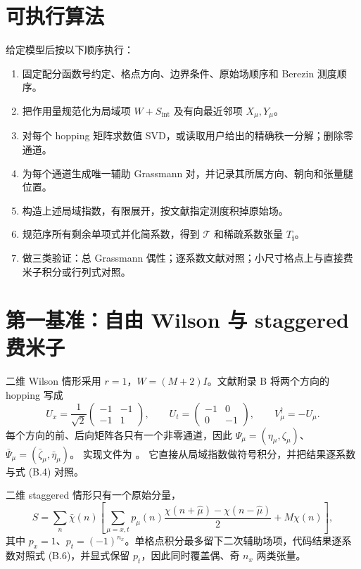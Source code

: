 \documentclass[UTF8,11pt]{ctexart}
\newcommand{\cT}{\mathcal{T}}
\begin{document}
\section{可执行算法}
给定模型后按以下顺序执行：
\begin{enumerate}
 \item 固定配分函数号约定、格点方向、边界条件、原始场顺序和 Berezin 测度顺序。
 \item 把作用量规范化为局域项 $W+S_{\mathrm{int}}$ 及有向最近邻项 $X_\mu,Y_\mu$。
 \item 对每个 hopping 矩阵求数值 SVD，或读取用户给出的精确秩一分解；删除零通道。
 \item 为每个通道生成唯一辅助 Grassmann 对，并记录其所属方向、朝向和张量腿位置。
 \item 构造上述局域指数，有限展开，按文献指定测度积掉原始场。
 \item 规范序所有剩余单项式并化简系数，得到 $\cT$ 和稀疏系数张量 $T_{\bm i}$。
 \item 做三类验证：总 Grassmann 偶性；逐系数文献对照；小尺寸格点上与直接费米子积分或行列式对照。
\end{enumerate}

\section{第一基准：自由 Wilson 与 staggered 费米子}
二维 Wilson 情形采用 $r=1$，$W=(M+2)I$。文献附录 B 将两个方向的 hopping 写成
\begin{equation}
 U_x=\frac1{\sqrt2}\begin{pmatrix}-1&-1\\-1&1\end{pmatrix},
 \qquad
 U_t=\begin{pmatrix}-1&0\\0&-1\end{pmatrix},
 \qquad V_\mu^\dagger=-U_\mu.
\end{equation}
每个方向的前、后向矩阵各只有一个非零通道，因此
$\Psi_\mu=(\eta_\mu,\zeta_\mu)$、
$\bar\Psi_\mu=(\bar\zeta_\mu,\bar\eta_\mu)$。
实现文件为 。
它直接从局域指数做符号积分，并把结果逐系数与式 (B.4) 对照。

二维 staggered 情形只有一个原始分量，
\begin{equation}
 S=\sum_n\bar\chi(n)\left[
 \sum_{\mu=x,t}p_\mu(n)\frac{\chi(n+\hat\mu)-\chi(n-\hat\mu)}2
 +M\chi(n)\right],
\end{equation}
其中 $p_x=1$、$p_t=(-1)^{n_x}$。单格点积分最多留下二次辅助场项，代码结果逐系数对照式 (B.6)，并显式保留 $p_t$，因此同时覆盖偶、奇 $n_x$ 两类张量。
\end{document}
